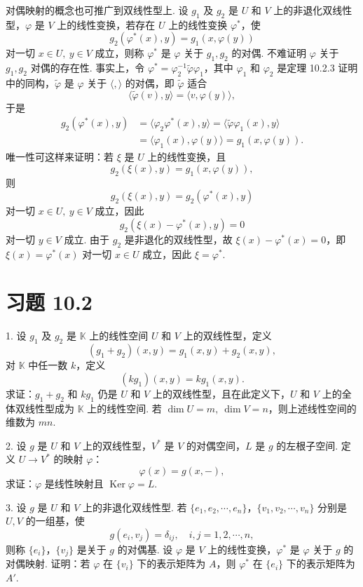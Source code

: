 \documentclass[UTF8,12pt,a4paper,fontset=fandol]{ctexart}
\begin{document}
对偶映射的概念也可推广到双线性型上. 设 $g_1$ 及 $g_2$ 是 $U$ 和 $V$ 上的非退化双线性型，$\varphi$ 是 $V$ 上的线性变换，若存在 $U$ 上的线性变换 $\varphi^*$，使
\[
  g_2(\varphi^*(x),y)=g_1(x,\varphi(y))
\]
对一切 $x\in U,\ y\in V$ 成立，则称 $\varphi^*$ 是 $\varphi$ 关于 $g_1,g_2$ 的对偶. 不难证明 $\varphi$ 关于 $g_1,g_2$ 对偶的存在性. 事实上，令 $\varphi^*=\varphi_2^{-1}\widetilde\varphi\varphi_1$，其中 $\varphi_1$ 和 $\varphi_2$ 是定理 10.2.3 证明中的同构，$\widetilde\varphi$ 是 $\varphi$ 关于 $\langle,\rangle$ 的对偶，即 $\widetilde\varphi$ 适合
\[
  \langle\widetilde\varphi(v),y\rangle=\langle v,\varphi(y)\rangle,
\]
于是
\[
\begin{aligned}
  g_2(\varphi^*(x),y)&=\langle\varphi_2\varphi^*(x),y\rangle
  =\langle\widetilde\varphi\varphi_1(x),y\rangle\\
  &=\langle\varphi_1(x),\varphi(y)\rangle
  =g_1(x,\varphi(y)).
\end{aligned}
\]
唯一性可这样来证明：若 $\xi$ 是 $U$ 上的线性变换，且
\[
  g_2(\xi(x),y)=g_1(x,\varphi(y)),
\]
则
\[
  g_2(\xi(x),y)=g_2(\varphi^*(x),y)
\]
对一切 $x\in U,\ y\in V$ 成立，因此
\[
  g_2(\xi(x)-\varphi^*(x),y)=0
\]
对一切 $y\in V$ 成立. 由于 $g_2$ 是非退化的双线性型，故 $\xi(x)-\varphi^*(x)=0$，即 $\xi(x)=\varphi^*(x)$ 对一切 $x\in U$ 成立，因此 $\xi=\varphi^*$.

\section*{习题 10.2}

1. 设 $g_1$ 及 $g_2$ 是 $\mathbb K$ 上的线性空间 $U$ 和 $V$ 上的双线性型，定义
\[
  (g_1+g_2)(x,y)=g_1(x,y)+g_2(x,y),
\]
对 $\mathbb K$ 中任一数 $k$，定义
\[
  (kg_1)(x,y)=kg_1(x,y).
\]
求证：$g_1+g_2$ 和 $kg_1$ 仍是 $U$ 和 $V$ 上的双线性型，且在此定义下，$U$ 和 $V$ 上的全体双线性型成为 $\mathbb K$ 上的线性空间. 若 $\dim U=m,\ \dim V=n$，则上述线性空间的维数为 $mn$.

2. 设 $g$ 是 $U$ 和 $V$ 上的双线性型，$V^*$ 是 $V$ 的对偶空间，$L$ 是 $g$ 的左根子空间. 定义 $U\to V^*$ 的映射 $\varphi$：
\[
  \varphi(x)=g(x,-),
\]
求证：$\varphi$ 是线性映射且 $\operatorname{Ker}\varphi=L$.

3. 设 $g$ 是 $U$ 和 $V$ 上的非退化双线性型. 若 $\{e_1,e_2,\cdots,e_n\}$，$\{v_1,v_2,\cdots,v_n\}$ 分别是 $U,V$ 的一组基，使
\[
  g(e_i,v_j)=\delta_{ij},\quad i,j=1,2,\cdots,n,
\]
则称 $\{e_i\}$，$\{v_j\}$ 是关于 $g$ 的对偶基. 设 $\varphi$ 是 $V$ 上的线性变换，$\varphi^*$ 是 $\varphi$ 关于 $g$ 的对偶映射. 证明：若 $\varphi$ 在 $\{v_i\}$ 下的表示矩阵为 $A$，则 $\varphi^*$ 在 $\{e_i\}$ 下的表示矩阵为 $A'$.
\end{document}
